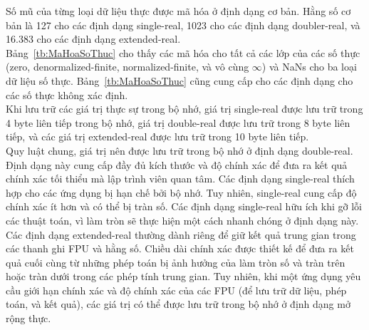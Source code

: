 	Số mũ của từng loại dữ liệu thực được mã hóa ở định dạng cơ bản. Hằng số cơ bản là 127 cho các định dạng single-real, 1023 cho các định dạng doubler-real, và 16.383 cho các định dạng extended-real.\\
	
	Bảng~\ref{tb:MaHoaSoThuc} cho thấy các mã hóa cho tất cả các lớp của các số thực (zero, denormalized-finite, normalized-finite, và vô cùng $\mathbb{\infty}$) và NaNs cho ba loại dữ liệu số thực. Bảng~\ref{tb:MaHoaSoThuc} cũng cung cấp cho các định dạng cho các số thực không xác định.\\

	Khi lưu trữ các giá trị thực sự trong bộ nhớ, giá trị single-real được lưu trữ trong 4 byte liên tiếp trong bộ nhớ, giá trị double-real được lưu trữ trong 8 byte liên tiếp, và các giá trị extended-real được lưu trữ trong 10 byte liên tiếp.\\

	Quy luật chung, giá trị nên được lưu trữ trong bộ nhớ ở định dạng double-real. Định dạng này cung cấp đầy đủ kích thước và độ chính xác để đưa ra kết quả chính xác tối thiểu mà lập trình viên quan tâm. Các định dạng single-real thích hợp cho các ứng dụng bị hạn chế bởi bộ nhớ. Tuy nhiên, single-real cung cấp độ chính xác ít hơn và có thể bị tràn số. Các định dạng single-real hữu ích khi gỡ lỗi các thuật toán, vì làm tròn sẽ thực hiện một cách nhanh chóng ở định dạng này. Các định dạng extended-real thường dành riêng để giữ kết quả trung gian trong các thanh ghi FPU và hằng số. Chiều dài chính xác được thiết kế để đưa ra kết quả cuối cùng từ những phép toán bị ảnh hưởng của làm tròn số và tràn trên hoặc tràn dưới trong các phép tính trung gian. Tuy nhiên, khi một ứng dụng yêu cầu giới hạn chính xác và độ chính xác của các FPU (để lưu trữ dữ liệu, phép toán, và kết quả), các giá trị có thể được lưu trữ trong bộ nhớ ở định dạng mở rộng thực.\\
	
